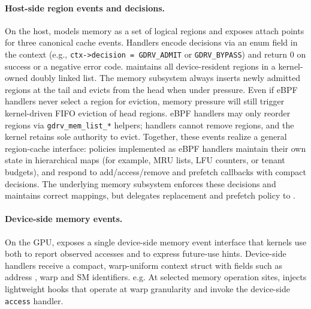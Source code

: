 




\paragraph{Host-side region events and decisions.}
On the host, \sys models memory as a set of logical regions and exposes attach points for three
canonical cache events. Handlers encode decisions via an enum field in the context (e.g., \texttt{ctx->decision = GDRV\_ADMIT} or \texttt{GDRV\_BYPASS}) and return 0 on success or a negative error code. \sys maintains all device-resident regions in a kernel-owned doubly linked list. The memory subsystem always inserts newly admitted regions at the tail and evicts from the head when under pressure. Even if eBPF handlers never select a region for eviction, memory pressure will still trigger kernel-driven FIFO eviction of head regions. eBPF handlers may only reorder regions via \texttt{gdrv\_mem\_list\_*} helpers; handlers cannot remove regions, and the kernel retains sole authority to evict. Together, these events realize a
general region-cache interface: policies implemented as eBPF handlers maintain their
own state in hierarchical maps (for example, MRU lists, LFU counters, or tenant budgets),
and respond to add/access/remove and prefetch callbacks with compact decisions. The underlying memory subsystem enforces these decisions
and maintains correct mappings, but delegates replacement and prefetch policy to
\sys.

\paragraph{Device-side memory events.}

On the GPU, \sys exposes a single device-side memory event interface that kernels
use both to report observed accesses and to express future-use hints. Device-side
handlers receive a compact, warp-uniform context struct with fields such as address , warp and SM identifiers. e.g. At selected memory operation sites, \sys injects lightweight hooks that operate at
warp granularity and invoke the device-side \texttt{access} handler.

